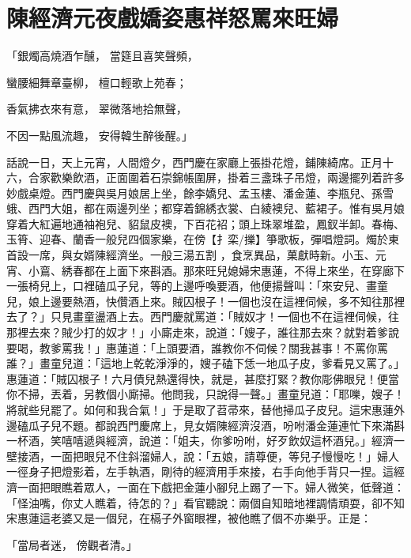 %

\chapter{陳經濟元夜戲嬌姿\KG 惠祥怒罵來旺婦}

「銀燭高燒酒乍醺，  當筵且喜笑聲頻，

蠻腰細舞章臺柳，  檀口輕歌上苑春；

香氣拂衣來有意，  翠微落地拾無聲，

不因一點風流趣，  安得韓生醉後醒。」

話說一日，天上元宵，人間燈夕，西門慶在家廳上張掛花燈，鋪陳綺席。正月十六，合家歡樂飲酒，正面圍着石崇錦帳圍屏，掛着三盞珠子吊燈，兩邊擺列着許多妙戲桌燈。西門慶與吳月娘居上坐，餘李嬌兒、孟玉樓、潘金蓮、李瓶兒、孫雪蛾、西門大姐，都在兩邊列坐；都穿着錦綉衣裳、白綾襖兒、藍裙子。惟有吳月娘穿着大紅遍地通袖袍兒、貂鼠皮襖，下百花袑；頭上珠翠堆盈，鳳釵半卸。春梅、玉筲、迎春、蘭香一般兒四個家樂，在傍【扌栾/擽】箏歌板，彈唱燈詞。燭於東首設一席，與女婿陳經濟坐。一般三湯五割 ，食烹異品，菓獻時新。小玉、元宵、小鵉、綉春都在上面下來斟酒。那來旺兒媳婦宋惠蓮，不得上來坐，在穿廊下一張椅兒上，口裡磕瓜子兒，等的上邊呼喚要酒，他便揚聲叫：「來安兒、畫童兒，娘上邊要熱酒，快儹酒上來。賊囚根子！一個也沒在這裡伺候，多不知往那裡去了？」只見畫童盪酒上去。西門慶就罵道：「賊奴才！一個也不在這裡伺候，往那裡去來？賊少打的奴才！」小廝走來，說道：「嫂子，誰往那去來？就對着爹說要喝，教爹罵我！」惠蓮道：「上頭要酒，誰教你不伺候？關我甚事！不罵你罵誰？」畫童兒道：「這地上乾乾淨淨的，嫂子磕下恁一地瓜子皮，爹看見又罵了。」惠蓮道：「賊囚根子！六月債兒熱還得快，就是，甚麼打緊？教你彫佛眼兒！便當你不掃，丟着，另教個小廝掃。他問我，只說得一聲。」畫童兒道：「耶嚛，嫂子！將就些兒罷了。如何和我合氣！」于是取了苕帚來，替他掃瓜子皮兒。這宋惠蓮外邊磕瓜子兒不題。都說西門慶席上，見女婿陳經濟沒酒，吩咐潘金蓮連忙下來滿斟一杯酒，笑嘻嘻遞與經濟，說道：「姐夫，你爹吩咐，好歹飲奴這杯酒兒。」經濟一壁接酒，一面把眼兒不住斜溜婦人，說：「五娘，請尊便，等兒子慢慢吃！」婦人一徑身子把燈影着，左手執酒，剛待的經濟用手來接，右手向他手背只一捏。這經濟一面把眼瞧着眾人，一面在下戲把金蓮小腳兒上踢了一下。婦人微笑，低聲道：「怪油嘴，你丈人瞧着，待怎的？」看官聽說：兩個自知暗地裡調情頑耍，卻不知宋惠蓮這老婆又是一個兒，在槅子外窗眼裡，被他瞧了個不亦樂乎。正是：

「當局者迷，  傍觀者清。」

